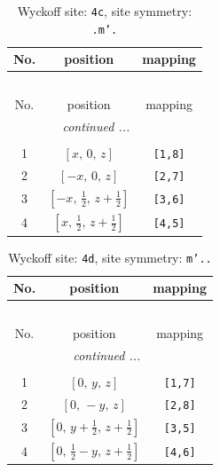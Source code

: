 \documentclass[fleqn,8pt]{jsarticle}
\begin{document}
\renewcommand{\arraystretch}{1.2}
\begin{longtable}{ccc}
\caption{Wyckoff site: {\tt 4c}, site symmetry: {\tt .m'.}}
 \\
 \hline \hline
No. & position & mapping \\ \hline \endfirsthead

\multicolumn{2}{l}{\tablename\ \thetable{}} \\
 \hline \hline
No. & position & mapping \\ \hline \endhead

 \hline \hline
\multicolumn{2}{r}{\footnotesize\it continued ...} \\ \endfoot

 \hline \hline
\multicolumn{2}{r}{} \\ \endlastfoot

1 & $\left[ x,\, 0,\, z \right]$ & {\tt [1,8]} \\ \hline
2 & $\left[ - x,\, 0,\, z \right]$ & {\tt [2,7]} \\ \hline
3 & $\left[ - x,\, \frac{1}{2},\, z + \frac{1}{2} \right]$ & {\tt [3,6]} \\ \hline
4 & $\left[ x,\, \frac{1}{2},\, z + \frac{1}{2} \right]$ & {\tt [4,5]} \\
\end{longtable}
\renewcommand{\arraystretch}{1.2}
\begin{longtable}{ccc}
\caption{Wyckoff site: {\tt 4d}, site symmetry: {\tt m'..}}
 \\
 \hline \hline
No. & position & mapping \\ \hline \endfirsthead

\multicolumn{2}{l}{\tablename\ \thetable{}} \\
 \hline \hline
No. & position & mapping \\ \hline \endhead

 \hline \hline
\multicolumn{2}{r}{\footnotesize\it continued ...} \\ \endfoot

 \hline \hline
\multicolumn{2}{r}{} \\ \endlastfoot

1 & $\left[ 0,\, y,\, z \right]$ & {\tt [1,7]} \\ \hline
2 & $\left[ 0,\, - y,\, z \right]$ & {\tt [2,8]} \\ \hline
3 & $\left[ 0,\, y + \frac{1}{2},\, z + \frac{1}{2} \right]$ & {\tt [3,5]} \\ \hline
4 & $\left[ 0,\, \frac{1}{2} - y,\, z + \frac{1}{2} \right]$ & {\tt [4,6]} \\
\end{longtable}
\end{document}
